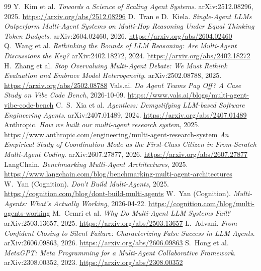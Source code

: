 \documentclass[11pt,a4paper]{article}
\begin{document}
\begin{thebibliography}{99}\small
{} Y.~Kim et al. \emph{Towards a Science of Scaling Agent Systems}. arXiv:2512.08296, 2025.
  \url{https://arxiv.org/abs/2512.08296}
 D.~Tran e D.~Kiela. \emph{Single-Agent LLMs Outperform Multi-Agent Systems on Multi-Hop
  Reasoning Under Equal Thinking Token Budgets}. arXiv:2604.02460, 2026. \url{https://arxiv.org/abs/2604.02460}
 Q.~Wang et al. \emph{Rethinking the Bounds of LLM Reasoning: Are Multi-Agent
  Discussions the Key?} arXiv:2402.18272, 2024. \url{https://arxiv.org/abs/2402.18272}
 H.~Zhang et al. \emph{Stop Overvaluing Multi-Agent Debate: We Must Rethink Evaluation and
  Embrace Model Heterogeneity}. arXiv:2502.08788, 2025.
  \url{https://arxiv.org/abs/2502.08788}
 Vals.ai. \emph{Do Agent Teams Pay Off? A Case Study on Vibe Code Bench}, 2026-10-09.
  \url{https://www.vals.ai/blogs/multi-agent-vibe-code-bench}
 C.~S.~Xia et al. \emph{Agentless: Demystifying LLM-based Software Engineering
  Agents}. arXiv:2407.01489, 2024. \url{https://arxiv.org/abs/2407.01489}
 Anthropic. \emph{How we built our multi-agent research system}, 2025.
  \url{https://www.anthropic.com/engineering/multi-agent-research-system}
 \emph{An Empirical Study of Coordination Mode as the First-Class Citizen in
  From-Scratch Multi-Agent Coding}. arXiv:2607.27877, 2026. \url{https://arxiv.org/abs/2607.27877}
 LangChain. \emph{Benchmarking Multi-Agent Architectures}, 2025.
  \url{https://www.langchain.com/blog/benchmarking-multi-agent-architectures}
 W.~Yan (Cognition). \emph{Don't Build Multi-Agents}, 2025.
  \url{https://cognition.com/blog/dont-build-multi-agents}
 W.~Yan (Cognition). \emph{Multi-Agents: What's Actually Working}, 2026-04-22.
  \url{https://cognition.com/blog/multi-agents-working}
 M.~Cemri et al. \emph{Why Do Multi-Agent LLM Systems Fail?} arXiv:2503.13657, 2025.
  \url{https://arxiv.org/abs/2503.13657}
 L.~Advani. \emph{From Confident Closing to Silent Failure: Characterizing False
  Success in LLM Agents}. arXiv:2606.09863, 2026. \url{https://arxiv.org/abs/2606.09863}
 S.~Hong et al. \emph{MetaGPT: Meta Programming for a Multi-Agent Collaborative
  Framework}. arXiv:2308.00352, 2023. \url{https://arxiv.org/abs/2308.00352}
\end{thebibliography}
\end{document}
